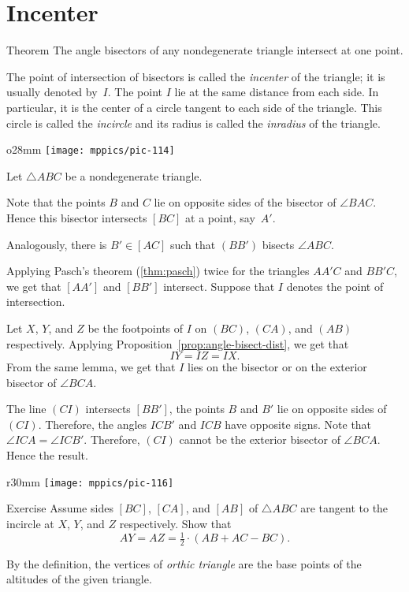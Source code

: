 \section{Incenter}

\begin{thm}[\abs]{Theorem}\label{thm:incenter}
The angle bisectors of any nondegenerate triangle intersect at one point.
\end{thm}


The point of intersection of bisectors is called the \emph{incenter} of the triangle; 
it is usually denoted by~$I$.
The point $I$ lie at the same distance from each side.
In particular, it is the center of a circle tangent to each side of the triangle.
This circle is called 
the \emph{incircle} and its radius is called 
the \emph{inradius} of the triangle.


\begin{wrapfigure}{o}{28mm}
\vskip-6mm
\centering
\texttt{[image: mppics/pic-114]}
\end{wrapfigure}

Let $\triangle ABC$ be a nondegenerate triangle.

Note that the points $B$ and $C$ lie on opposite sides of the bisector of $\angle BAC$.
Hence this bisector intersects $[BC]$ at a point, say~$A'$.

Analogously, there is $B'\in[AC]$ 
such that $(BB')$ bisects $\angle ABC$.

Applying Pasch's theorem (\ref{thm:pasch}) twice
for the triangles $AA'C$ and $BB'C$,
we get that $[AA']$ and $[BB']$ intersect.
Suppose that $I$ denotes the point of intersection.

Let $X$, $Y$, and $Z$ be the footpoints of $I$ on  $(B C)$, $(C A)$, and $(A B)$ respectively.
Applying Proposition~\ref{prop:angle-bisect-dist}, we get that
$$I Y=I Z=I X.$$
From the same lemma, we get that $I$ lies on the bisector or on the exterior bisector of $\angle B C A$.

The line $(C I)$ intersects $[B B']$,
the points $B$ and $B'$ lie on opposite sides of~$(C I)$.
Therefore, the angles $I C B'$ and $I C B$ have opposite signs.
Note that $\angle I C A=\angle I C B'$.
Therefore, $(C I)$ cannot be the exterior bisector of $\angle B C A$.
Hence the result.
\qeds

{

\begin{wrapfigure}{r}{30mm}
\centering
\vskip-2mm
\texttt{[image: mppics/pic-116]}
\end{wrapfigure}

\begin{thm}{Exercise}\label{ex:2x=b+c-a}
Assume sides $[B C]$, $[C A]$, and $[A B]$ of $\triangle A B C$ are tangent to the incircle at $X$, $Y$, and $Z$ respectively. 
Show that 
$$AY=AZ= \tfrac12\cdot(A B+ A C- B C).$$

\end{thm}

By the definition, the vertices of \emph{orthic triangle} are the base points of the altitudes of the given triangle.

}

